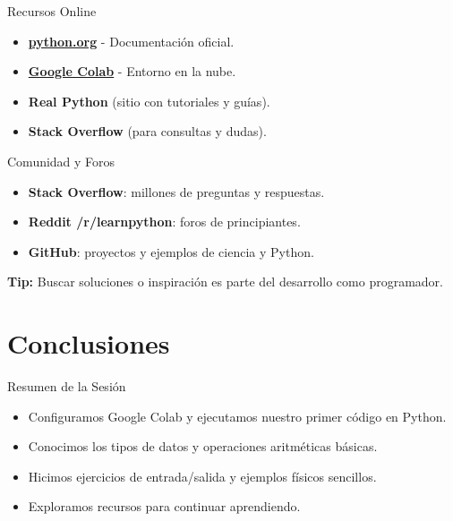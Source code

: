 \documentclass[10pt]{beamer}
\begin{document}
\begin{frame}{Recursos Online}
  \begin{itemize}
    \item \href{https://www.python.org}{\textbf{python.org}} - Documentación oficial.
    \item \href{https://colab.research.google.com}{\textbf{Google Colab}} - Entorno en la nube.
    \item \textbf{Real Python} (sitio con tutoriales y guías).
    \item \textbf{Stack Overflow} (para consultas y dudas).
  \end{itemize}
\end{frame}

\begin{frame}{Comunidad y Foros}
  \begin{itemize}
    \item \textbf{Stack Overflow}: millones de preguntas y respuestas.
    \item \textbf{Reddit /r/learnpython}: foros de principiantes.
    \item \textbf{GitHub}: proyectos y ejemplos de ciencia y Python.
  \end{itemize}
  \textbf{Tip:} Buscar soluciones o inspiración es parte del desarrollo como programador.
\end{frame}

\section{Conclusiones}

\begin{frame}{Resumen de la Sesión}
  \begin{itemize}
    \item Configuramos Google Colab y ejecutamos nuestro primer código en Python.
    \item Conocimos los tipos de datos y operaciones aritméticas básicas.
    \item Hicimos ejercicios de entrada/salida y ejemplos físicos sencillos.
    \item Exploramos recursos para continuar aprendiendo.
  \end{itemize}
\end{frame}
\end{document}
